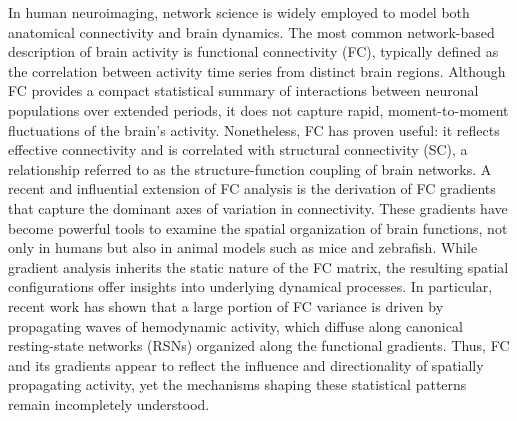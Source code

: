 \documentclass{article}
\begin{document}
In human neuroimaging, network science is widely employed to model both anatomical connectivity and brain dynamics\cite{bassett2017network}. The most common network-based description of brain activity is functional connectivity (FC), typically defined as the correlation between activity time series from distinct brain regions. Although FC provides a compact statistical summary of interactions between neuronal populations over extended periods, it does not capture rapid, moment-to-moment fluctuations of the brain's activity\cite{zamani2020high}. Nonetheless, FC has proven useful: it reflects effective connectivity and is correlated with structural connectivity (SC), a relationship referred to as the structure-function coupling of brain networks\cite{fotiadis2024structure}. A recent and influential extension of FC analysis is the derivation of FC gradients that capture the dominant axes of variation in connectivity\cite{margulies2016situating, huntenburg2018large, bernhardt2022gradients}. These gradients have become powerful tools to examine the spatial organization of brain functions, not only in humans but also in animal models such as mice and zebrafish\cite{coletta2020network, legare2025structural}. While gradient analysis inherits the static nature of the FC matrix, the resulting spatial configurations offer insights into underlying dynamical processes. In particular, recent work has shown that a large portion of FC variance is driven by propagating waves of hemodynamic activity, which diffuse along canonical resting-state networks (RSNs) organized along the functional gradients\cite{yousefi2021propagating, raut2021global}. Thus, FC and its gradients appear to reflect the influence and directionality of spatially propagating activity, yet the mechanisms shaping these statistical patterns remain incompletely understood.
\end{document}

